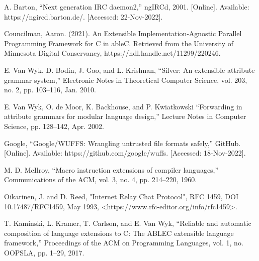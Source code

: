 \documentclass[12pt]{article}
\begin{document}




\newpage

\hypersetup{hidelinks}
\tableofcontents

\newpage


\newpage

\newpage

\newpage

\newpage

\newpage

\newpage

\newpage
\begin{thebibliography}{99}
		A. Barton, “Next generation IRC daemon2,” ngIRCd, 2001. [Online]. Available: https://ngircd.barton.de/.
		[Accessed: 22-Nov-2022]. 


		Councilman, Aaron. (2021). An Extensible Implementation-Agnostic Parallel Programming Framework for C in ableC. Retrieved from the University of
		Minnesota Digital Conservancy, https://hdl.handle.net/11299/220246.

        E. Van Wyk, D. Bodin, J. Gao, and L. Krishnan, “Silver: An extensible 
        attribute grammar system,” Electronic Notes in Theoretical Computer 
        Science, vol. 203, no. 2, pp. 103–116, Jan. 2010. 

		E. Van Wyk, O. de Moor, K. Backhouse, and P. Kwiatkowski “Forwarding in 
        attribute grammars for modular language design,” Lecture Notes in 
        Computer Science, pp. 128–142, Apr. 2002.
    
        Google, “Google/WUFFS: Wrangling untrusted file formats safely,” GitHub. 
        [Online]. Available: https://github.com/google/wuffs. [Accessed: 
        18-Nov-2022]. 
	
		M. D. McIlroy, “Macro instruction extensions of compiler languages,” 
        Communications of the ACM, vol. 3, no. 4, pp. 214–220, 1960. 
	
	    Oikarinen, J. and D. Reed, "Internet Relay Chat Protocol", RFC 1459, DOI 
        10.17487/RFC1459, May 1993, <https://www.rfc-editor.org/info/rfc1459>.
		
	    T. Kaminski, L. Kramer, T. Carlson, and E. Van Wyk, “Reliable and 
        automatic composition of language extensions to C: The ABLEC extensible 
        language framework,” Proceedings of the ACM on Programming Languages, 
        vol. 1, no. OOPSLA, pp. 1–29, 2017. 
\end{thebibliography}
\end{document}
